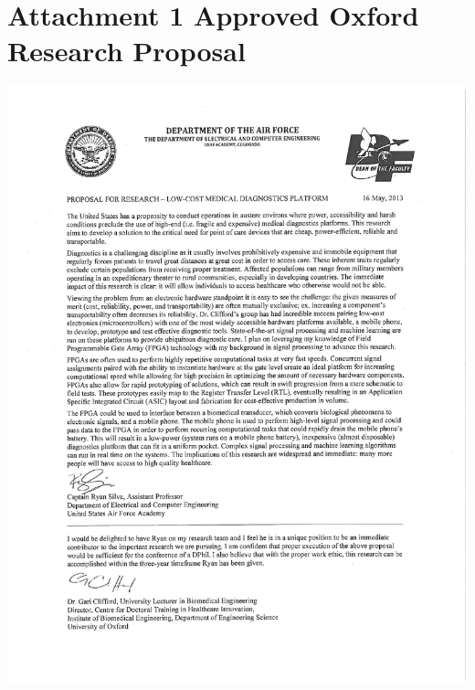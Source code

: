 \documentclass{article}
\begin{document}
\newpage
\section*{Attachment 1 \newline Approved Oxford Research Proposal}
\label{sec:prop}
\centering
\vspace{-5mm}
\includegraphics[scale=.85,clip=true,trim=1in .5in 1cm 0.4in]{MFR_ProposalforResearch_SilvaSIGNED.pdf}

\newpage
\end{document}
